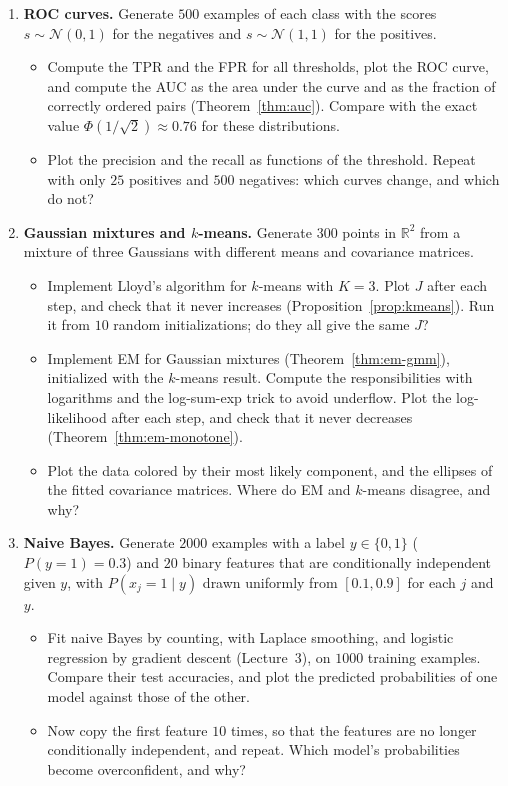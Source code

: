 \documentclass[11pt]{article}
\theoremstyle{definition}
\theoremstyle{plain}
\theoremstyle{remark}
\begin{document}
\begin{enumerate}[label=\textbf{P\arabic*.}, leftmargin=*]
    \item \textbf{ROC curves.} Generate $500$ examples of each class with the scores $s \sim \mathcal{N}(0, 1)$ for the negatives and $s \sim \mathcal{N}(1, 1)$ for the positives.
    \begin{itemize}
        \item Compute the TPR and the FPR for all thresholds, plot the ROC curve, and compute the AUC as the area under the curve and as the fraction of correctly ordered pairs (Theorem~\ref{thm:auc}). Compare with the exact value $\Phi(1/\sqrt{2}) \approx 0.76$ for these distributions.
        \item Plot the precision and the recall as functions of the threshold. Repeat with only $25$ positives and $500$ negatives: which curves change, and which do not?
    \end{itemize}

    \item \textbf{Gaussian mixtures and $k$-means.} Generate $300$ points in $\mathbb{R}^2$ from a mixture of three Gaussians with different means and covariance matrices.
    \begin{itemize}
        \item Implement Lloyd's algorithm for $k$-means with $K = 3$. Plot $J$ after each step, and check that it never increases (Proposition~\ref{prop:kmeans}). Run it from $10$ random initializations; do they all give the same $J$?
        \item Implement EM for Gaussian mixtures (Theorem~\ref{thm:em-gmm}), initialized with the $k$-means result. Compute the responsibilities with logarithms and the log-sum-exp trick to avoid underflow. Plot the log-likelihood after each step, and check that it never decreases (Theorem~\ref{thm:em-monotone}).
        \item Plot the data colored by their most likely component, and the ellipses of the fitted covariance matrices. Where do EM and $k$-means disagree, and why?
    \end{itemize}

    \item \textbf{Naive Bayes.} Generate $2000$ examples with a label $y \in \{0, 1\}$ ($P(y = 1) = 0.3$) and $20$ binary features that are conditionally independent given $y$, with $P(x_j = 1 \mid y)$ drawn uniformly from $[0.1, 0.9]$ for each $j$ and $y$.
    \begin{itemize}
        \item Fit naive Bayes by counting, with Laplace smoothing, and logistic regression by gradient descent (Lecture~3), on $1000$ training examples. Compare their test accuracies, and plot the predicted probabilities of one model against those of the other.
        \item Now copy the first feature $10$ times, so that the features are no longer conditionally independent, and repeat. Which model's probabilities become overconfident, and why?
    \end{itemize}


\end{enumerate}
\end{document}
